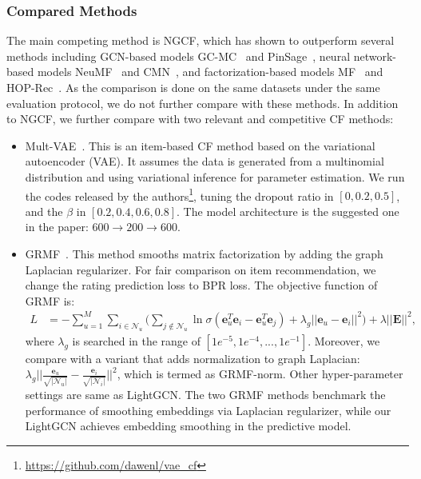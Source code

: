   
\subsubsection{Compared Methods} The main competing method is NGCF, which has shown to outperform several methods including GCN-based models GC-MC~\cite{GC-MC} and PinSage~\cite{PinSage}, neural network-based models NeuMF~\cite{NCF} and CMN~\cite{CMN}, and factorization-based models MF~\cite{BPRMF} and HOP-Rec~\cite{HOP-rec}.
As the comparison is done on the same datasets under the same evaluation protocol, we do not further compare with these methods. In addition to NGCF, we further compare with two relevant and competitive CF methods:
\begin{itemize}[leftmargin=*]
\item Mult-VAE~\cite{VACF}. This is an item-based CF method based on the variational autoencoder (VAE). 
It assumes the data is generated from a multinomial distribution and using variational inference for parameter estimation. 
We run the codes released by the authors\footnote{\url{https://github.com/dawenl/vae_cf}}, tuning the dropout ratio in $[0, 0.2, 0.5]$, and the $\beta$ in $[0.2,0.4,0.6,0.8]$. The model architecture is the suggested one in the paper: $600\rightarrow 200 \rightarrow 600$. 
\item GRMF~\cite{rao2015collaborative}. This method smooths matrix factorization by adding the graph Laplacian regularizer.
For fair comparison on item recommendation, we change the rating prediction loss to BPR loss. The objective function of GRMF is:
\begin{equation}
\begin{aligned}
    L &= - \sum_{u=1}^{M} \sum_{i \in \mathcal{N}_u} \Big(\sum_{j \notin \mathcal{N}_u} \ln \sigma (\textbf{e}_u^T \textbf{e}_i - \textbf{e}_u^T \textbf{e}_j ) + \lambda_{g} ||\textbf{e}_u - \textbf{e}_i||^2 \Big)+ \lambda ||\textbf{E}||^2,
\end{aligned}
\end{equation}
where $\lambda_g$ is searched in the range of $[1e^{-5}, 1e^{-4}, ..., 1e^{-1}]$. 
Moreover, we compare with a variant that adds normalization to graph Laplacian: $\lambda_{g} ||\frac{\textbf{e}_u}{\sqrt{|\mathcal{N}_u|}} - \frac{\textbf{e}_i}{\sqrt{|\mathcal{N}_i|}}||^2$, which is termed as GRMF-norm. 
Other hyper-parameter settings are same as LightGCN. 
The two GRMF methods benchmark the performance of smoothing embeddings via Laplacian regularizer, while our LightGCN achieves embedding smoothing in the predictive model. 
\end{itemize}

